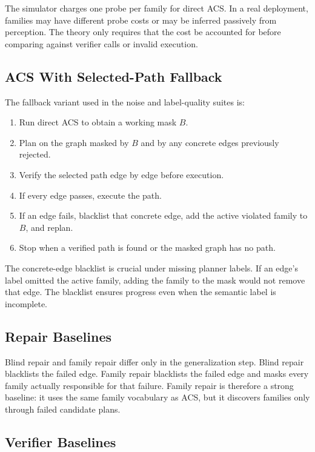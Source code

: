 \documentclass{article}
\newcommand{\ACS}{\textsc{ACS}}
\begin{document}
The simulator charges one probe per family for direct \ACS{}. In a real deployment, families may have different probe costs or may be inferred passively from perception. The theory only requires that the cost be accounted for before comparing against verifier calls or invalid execution.

\subsection{\ACS{} With Selected-Path Fallback}

The fallback variant used in the noise and label-quality suites is:
\begin{enumerate}
    \item Run direct \ACS{} to obtain a working mask $B$.
    \item Plan on the graph masked by $B$ and by any concrete edges previously rejected.
    \item Verify the selected path edge by edge before execution.
    \item If every edge passes, execute the path.
    \item If an edge fails, blacklist that concrete edge, add the active violated family to $B$, and replan.
    \item Stop when a verified path is found or the masked graph has no path.
\end{enumerate}

The concrete-edge blacklist is crucial under missing planner labels. If an edge's label omitted the active family, adding the family to the mask would not remove that edge. The blacklist ensures progress even when the semantic label is incomplete.

\subsection{Repair Baselines}

Blind repair and family repair differ only in the generalization step. Blind repair blacklists the failed edge. Family repair blacklists the failed edge and masks every family actually responsible for that failure. Family repair is therefore a strong baseline: it uses the same family vocabulary as \ACS{}, but it discovers families only through failed candidate plans.

\subsection{Verifier Baselines}
\end{document}
